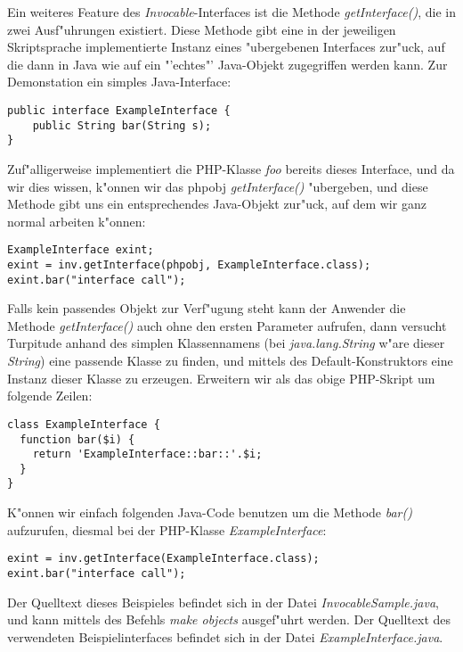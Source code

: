 Ein weiteres Feature des \emph{Invocable}-Interfaces ist die Methode \emph{getInterface()}, die in zwei
Ausf"uhrungen existiert. Diese Methode gibt eine in der jeweiligen Skriptsprache implementierte Instanz eines
"ubergebenen Interfaces zur"uck, auf die dann in Java wie auf ein "'echtes"' Java-Objekt zugegriffen werden kann.
Zur Demonstation ein simples Java-Interface:
\begin{lstlisting}[caption=Java-Interface]
public interface ExampleInterface {
    public String bar(String s);
}
\end{lstlisting}
Zuf"alligerweise implementiert die PHP-Klasse \emph{foo} bereits dieses Interface, und da wir dies
wissen, k"onnen wir das phpobj \emph{getInterface()} "ubergeben, und diese Methode gibt uns ein 
entsprechendes Java-Objekt zur"uck, auf dem wir ganz normal arbeiten k"onnen:
\begin{lstlisting}[caption=getInterface() mit "ubergebenem Objekt]
ExampleInterface exint;
exint = inv.getInterface(phpobj, ExampleInterface.class);
exint.bar("interface call");
\end{lstlisting}
Falls kein passendes Objekt zur Verf"ugung steht kann der Anwender die Methode \emph{getInterface()}
auch ohne den ersten Parameter aufrufen, dann versucht Turpitude anhand des simplen Klassennamens
(bei \emph{java.lang.String} w"are dieser \emph{String}) eine passende Klasse zu finden, und mittels
des Default-Konstruktors eine Instanz dieser Klasse zu erzeugen. Erweitern wir als das obige
PHP-Skript um folgende Zeilen:
\begin{lstlisting}[caption=Interface Implementation in PHP]
class ExampleInterface {
  function bar($i) {
    return 'ExampleInterface::bar::'.$i;
  }
}
\end{lstlisting}
K"onnen wir einfach folgenden Java-Code benutzen um die Methode \emph{bar()} aufzurufen,
diesmal bei der PHP-Klasse \emph{ExampleInterface}:
\begin{lstlisting}[caption=getInterface() mit "ubergebenes Objekt]
exint = inv.getInterface(ExampleInterface.class);
exint.bar("interface call");
\end{lstlisting}


Der Quelltext dieses Beispieles befindet sich in der Datei \emph{InvocableSample.java}, 
und kann mittels des Befehls \emph{make objects} ausgef"uhrt werden. Der Quelltext des
verwendeten Beispielinterfaces befindet sich in der Datei \emph{ExampleInterface.java}.

